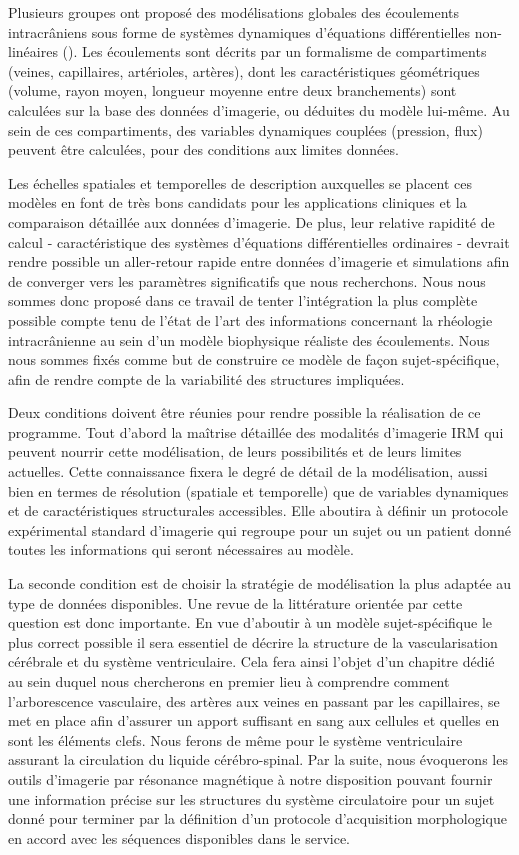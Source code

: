 Plusieurs groupes ont proposé des modélisations globales des écoulements intracrâniens sous forme de systèmes dynamiques d'équations différentielles non-linéaires (\cite{Sorek1988}). Les écoulements sont décrits par 
un formalisme de compartiments (veines, capillaires, artérioles, artères), dont les caractéristiques géométriques (volume, rayon moyen, longueur moyenne entre deux branchements) sont calculées sur la 
base des données d'imagerie, ou déduites du modèle lui-même. Au sein de ces compartiments, des variables dynamiques couplées (pression, flux) peuvent être calculées, pour des conditions aux limites 
données.

Les échelles spatiales et temporelles de description auxquelles se placent ces modèles en font de très bons candidats pour les applications cliniques et la comparaison détaillée aux données d'imagerie. De plus, leur relative rapidité de calcul - caractéristique des systèmes d'équations différentielles
ordinaires - devrait rendre possible un aller-retour rapide entre données d'imagerie et simulations afin de converger vers les paramètres significatifs que nous recherchons.
Nous nous sommes donc proposé dans ce travail de tenter l'intégration la plus complète possible compte tenu de l'état de l'art des informations concernant la rhéologie intracrânienne au sein 
d'un modèle biophysique réaliste des écoulements. Nous nous sommes fixés comme but de construire ce modèle de façon sujet-spécifique, afin de rendre compte de la variabilité des structures 
impliquées.

Deux conditions doivent être réunies pour rendre possible la réalisation de ce programme. Tout d'abord la maîtrise détaillée des modalités d'imagerie IRM qui peuvent nourrir cette modélisation, 
de leurs possibilités et de leurs limites actuelles. Cette connaissance fixera le degré de détail de la modélisation, aussi bien en termes de résolution (spatiale et temporelle) que de variables 
dynamiques et de caractéristiques structurales accessibles. Elle aboutira à définir un protocole expérimental standard d'imagerie qui regroupe pour un sujet ou un patient donné toutes les informations 
qui seront nécessaires au modèle.

La seconde condition est de choisir la stratégie de modélisation la plus adaptée au type de données disponibles. Une revue de la littérature orientée par cette question est donc importante.
En vue d’aboutir à un modèle sujet-spécifique le plus correct possible il sera essentiel de décrire la structure de la vascularisation cérébrale et du système ventriculaire. Cela fera ainsi l’objet 
d’un chapitre dédié au sein duquel nous chercherons en premier lieu à comprendre comment l’arborescence vasculaire, des artères aux veines en passant par les capillaires, se met en place afin d’assurer 
un apport suffisant en sang aux cellules et quelles en sont les éléments clefs. Nous ferons de même pour le système ventriculaire assurant la circulation du liquide cérébro-spinal. Par la suite, 
nous évoquerons les outils d’imagerie par résonance magnétique à notre disposition pouvant fournir une information précise sur les structures du système circulatoire pour un sujet donné pour terminer 
par la définition d’un protocole d’acquisition morphologique en accord avec les séquences disponibles dans le service.

